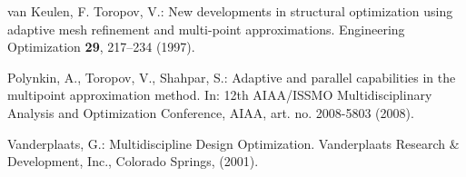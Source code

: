 \documentclass[runningheads,a4paper]{llncs}
\begin{document}
\begin{thebibliography}{10}
van Keulen, F. Toropov, V.:
\newblock New developments in structural optimization using adaptive mesh refinement and multi-point approximations.
\newblock Engineering Optimization \textbf{29}, 217--234 (1997).

Polynkin, A., Toropov, V., Shahpar, S.:
\newblock Adaptive and parallel capabilities in the multipoint approximation  method.
\newblock In: 12th AIAA/ISSMO Multidisciplinary Analysis and Optimization Conference, AIAA, art. no. 2008-5803
(2008).

Vanderplaats, G.:
\newblock Multidiscipline Design Optimization.
\newblock Vanderplaats Research \& Development, Inc., Colorado Springs, (2001).

\end{thebibliography}
\end{document}
